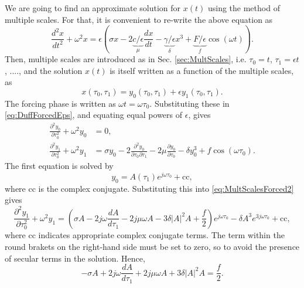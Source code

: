 \documentclass[11pt,twoside,a4paper,english]{book}
\begin{document}
We are going to find an approximate solution for $x(t)$ using the method of multiple scales. For that, it is convenient to re-write the above equation as
\begin{equation}\label{eq:DuffForcedEps}
\frac{d^2 x}{dt^2} + \omega^2 x = \epsilon \left( \sigma x -2\underbrace{c/\epsilon}_{\mu} \frac{d x}{dt} - \underbrace{\gamma/\epsilon}_{\delta} x^3 + \underbrace{{F}/{\epsilon}}_{f}\cos(\omega t)\right).
\end{equation}
Then, multiple scales are introduced as in Sec. \ref{sec:MultScales}, i.e. $\tau_0 = t$, $\tau_1 = \epsilon t$, ...., and the solution $x(t)$ is itself written as a function of the multiple scales, as
\begin{equation}
x(\tau_0,\tau_1) = y_0(\tau_0, \tau_1) + \epsilon y_1(\tau_0, \tau_1).
\end{equation}
The forcing phase is  written as $\omega t = \omega \tau_0$.
Substituting these in \eqref{eq:DuffForcedEps}, and equating equal powers of $\epsilon$, gives
\begin{subequations}
    \begin{align}
          \frac{\partial^2 y_0}{\partial \tau_0^2} + \omega^2 y_0 &= 0, \label{eq:MultScalesForced1}\\
          \frac{\partial^2 y_1}{\partial\tau_0^2} + \omega^2 y_1 &= \sigma y_0 - 2\frac{\partial^2 y_0}{\partial \tau_0 \partial \tau_1} - 2\mu \frac{\partial y_0}{\partial \tau_0}-\delta y_0^3+  f \cos(\omega\tau_0). \label{eq:MultScalesForced2}
    \end{align}
\end{subequations}
The first equation is solved by
\begin{equation}
y_0 = A (\tau_1) e^{j\omega \tau_0} + \text{cc},
\end{equation}
where $\text{cc}$ is the complex conjugate. Substituting this into \eqref{eq:MultScalesForced2} gives
\begin{equation}
\frac{\partial^2 y_1}{\partial\tau_0^2} + \omega^2 y_1 = \left(\sigma A - 2j\omega\frac{dA}{d\tau_1} - 2j\mu\omega A - 3\delta |A|^2 A + \frac{f}{2}\right)e^{j\omega \tau_0} - \delta A^3e^{3j\omega\tau_0} + \text{cc},
\end{equation}
where $\text{cc}$ indicates  appropriate complex conjugate terms. The term within the round brakets on the right-hand side must be set to zero, so to avoid the presence of secular terms in the solution. Hence,
\begin{equation}\label{eq:DuffAmplEq}
-\sigma A + 2j\omega\frac{dA}{d\tau_1} + 2j\mu\omega A + 3\delta |A|^2 A = \frac{f}{2}  .
\end{equation}
\end{document}
